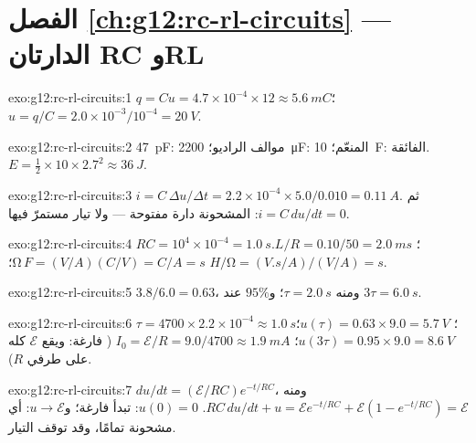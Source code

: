 \section*{الفصل \ref{ch:g12:rc-rl-circuits} --- الدارتان RC وRL}

\begin{solution}{exo:g12:rc-rl-circuits:1}
$q = Cu = 4.7\times10^{-4} \times 12 \approx \qty{5.6}{mC}$؛
$u = q/C = 2.0\times10^{-3}/10^{-4} = \qty{20}{V}$.
\end{solution}

\begin{solution}{exo:g12:rc-rl-circuits:2}
\qty{47}{pF}: موالف الراديو؛ \qty{2200}{\micro F}: المنعّم؛ \qty{10}{F}:
 الفائقة. $E = \tfrac12 \times 10 \times 2.7^2 \approx \qty{36}{J}$.
\end{solution}

\begin{solution}{exo:g12:rc-rl-circuits:3}
$i = C\,\Delta u/\Delta t = 2.2\times10^{-4} \times 5.0/0.010 =
\qty{0.11}{A}$. ثم $i = C\,du/dt = 0$:  المشحونة دارة
مفتوحة --- ولا تيار مستمرّ فيها.
\end{solution}

\begin{solution}{exo:g12:rc-rl-circuits:4}
$RC = 10^4 \times 10^{-4} = \qty{1.0}{s}$؛
$L/R = 0.10/50 = \qty{2.0}{ms}$. $\unit{\ohm}\,\unit{F} =
(\unit{V/A})(\unit{C/V}) = \unit{C/A} = \unit{s}$؛
$\unit{H}/\unit{\ohm} = (\unit{V.s/A})/(\unit{V/A}) = \unit{s}$.
\end{solution}

\begin{solution}{exo:g12:rc-rl-circuits:5}
$3.8/6.0 = 0.63$، ومنه $\tau = \qty{2.0}{s}$؛ و$95\%$ عند $3\tau =
\qty{6.0}{s}$.
\end{solution}

\begin{solution}{exo:g12:rc-rl-circuits:6}
$\tau = 4700 \times 2.2\times10^{-4} \approx \qty{1.0}{s}$؛
$u(\tau) = 0.63 \times 9.0 = \qty{5.7}{V}$؛
$u(3\tau) = 0.95 \times 9.0 = \qty{8.6}{V}$؛
$I_0 = \mathcal{E}/R = 9.0/4700 \approx \qty{1.9}{mA}$ ( فارغة:
ويقع $\mathcal{E}$ كله على طرفي $R$).
\end{solution}

\begin{solution}{exo:g12:rc-rl-circuits:7}
$du/dt = (\mathcal{E}/RC)e^{-t/RC}$، ومنه $RC\,du/dt + u =
\mathcal{E}e^{-t/RC} + \mathcal{E}(1 - e^{-t/RC}) = \mathcal{E}$.
$u(0) = 0$:  تبدأ فارغة؛ و$u \to \mathcal{E}$: أي مشحونة
تمامًا، وقد توقف التيار.
\end{solution}

